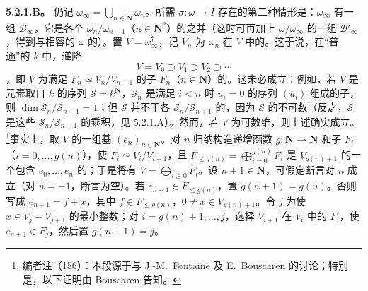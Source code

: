 \textbf{5.2.1.B。} 仍记 $\omega_\infty=\overline{\bigcup_{n\in\mathbf N}\omega_n}$。所需 $\sigma:\omega\to I$ 存在的第二种情形是：$\omega_\infty$ 有一组 $\mathscr B_\infty$，它是各个 $\omega_n/\omega_{n-1}$（$n\in\mathbf N^*$）的之并（这时可再加上 $\omega/\omega_\infty$ 的一组 $\mathscr B'_\infty$，得到与相容的 $\omega$ 的）。置 $V=\omega_\infty^\dagger$，记 $V_n$ 为 $\omega_n$ 在 $V$ 中的。这于说，在“普通”的 $k$-中，递降
\[V=V_0\supset V_1\supset V_2\supset\cdots\]
，即 $V$ 为满足 $F_n\simeq V_n/V_{n+1}$ 的子 $F_n$（$n\in\mathbf N$）的。这未必成立：例如，若 $V$ 是元素取自 $k$ 的序列 $\mathscr S=k^{\mathbf N}$，$\mathscr S_n$ 是满足 $i<n$ 时 $u_i=0$ 的序列 $(u_i)$ 组成的子，则 $\dim\mathscr S_n/\mathscr S_{n+1}=1$；但 $\mathscr S$ 并不于各 $\mathscr S_n/\mathscr S_{n+1}$ 的，因为 $\mathscr S$ 的不可数（反之，$\mathscr S$ 是这些 $\mathscr S_n/\mathscr S_{n+1}$ 的乘积，见 5.2.1.A）。然而，若 $V$ 为可数维，则上述确实成立。\footnote{编者注（156）：本段源于与 J.-M.~Fontaine 及 E.~Bouscaren 的讨论；特别是，以下证明由 Bouscaren 告知。}事实上，取 $V$ 的一组基 $(e_n)_{n\in\mathbf N}$。对 $n$ 归纳构造递增函数 $g:\mathbf N\to\mathbf N$ 和子 $F_i$（$i=0,\ldots,g(n)$），使 $F_i\simeq V_i/V_{i+1}$，且 $F_{\leq g(n)}=\bigoplus_{i=0}^{g(n)}F_i$ 是 $V_{g(n)+1}$ 的一个包含 $e_0,\ldots,e_n$ 的；于是将有 $V=\bigoplus_{i\geq0}F_i$。设 $n+1\in\mathbf N$，可假定断言对 $n$ 成立（对 $n=-1$，断言为空）。若 $e_{n+1}\in F_{\leq g(n)}$，置 $g(n+1)=g(n)$。否则写成 $e_{n+1}=f+x$，其中 $f\in F_{\leq g(n)}$，$0\ne x\in V_{g(n)+1}$。令 $j$ 为使 $x\in V_j-V_{j+1}$ 的最小整数；对 $i=g(n)+1,\ldots,j$，选择 $V_{i+1}$ 在 $V_i$ 中的 $F_i$，使 $e_{n+1}\in F_j$，然后置 $g(n+1)=j$。

